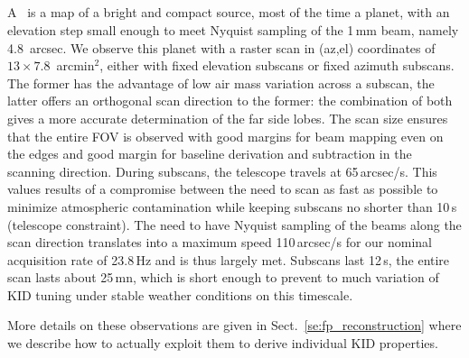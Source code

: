 
\subsection{\bms}
\label{se:beammaps}

A \bm\ is a map of a bright and compact source, most of the time
a planet, with an elevation step small enough to meet Nyquist sampling of the
1\,mm beam, namely 4.8~arcsec. We observe this planet with a raster scan in
(az,el) coordinates of $13\times7.8$~arcmin$^2$, either with fixed elevation subscans or fixed azimuth
subscans. The former has the advantage of low air mass variation across a
subscan, the latter offers an orthogonal scan direction to the former: the
combination of both gives a more accurate determination of the far side
lobes. The scan size ensures that the entire FOV is
observed with good margins for beam mapping even on the edges and good margin
for baseline derivation and subtraction in the scanning direction. During
subscans, the telescope travels at 65\,arcsec/s. This values
results of a compromise between the need to scan as fast as possible to minimize
atmospheric contamination while keeping subscans no shorter than 10\,s
(telescope constraint). The need to have Nyquist sampling of the beams along the
scan direction translates into a maximum speed 110\,arcsec/s for our nominal
acquisition rate of 23.8\,Hz and is thus largely met. Subscans last 12\,s, the
entire scan lasts about 25\,mn, which is short enough to prevent to much
variation of KID tuning under stable weather conditions on this timescale.




 More details on these observations are given in
Sect.~\ref{se:fp_reconstruction} where we describe how to actually exploit them
to derive individual KID properties.


